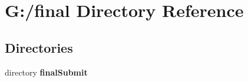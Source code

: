 \section{G\-:/final Directory Reference}
\label{dir_a1289a4ff4826aba63c36599e58489ec}
\subsection*{Directories}
\begin{DoxyCompactItemize}
\item 
directory {\bf final\-Submit}
\end{DoxyCompactItemize}
